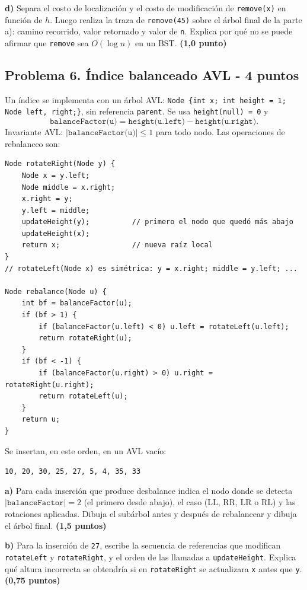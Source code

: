 \documentclass[11pt,a4paper]{article}
\newcommand{\pts}[1]{\textbf{(#1)}}
\begin{document}
\textbf{d)} Separa el costo de localización y el costo de modificación de \texttt{remove(x)} en función de $h$. Luego realiza la traza de \texttt{remove(45)} sobre el árbol final de la parte a): camino recorrido, valor retornado y valor de \texttt{n}. Explica por qué no se puede afirmar que \texttt{remove} sea $O(\log n)$ en un BST. \pts{1,0 punto}

\newpage
\subsection*{Problema 6. Índice balanceado AVL - 4 puntos}

Un índice se implementa con un árbol AVL:
\texttt{Node \{int x; int height = 1; Node left, right;\}}, sin referencia \texttt{parent}. Se usa \texttt{height(null) = 0} y
\[
\texttt{balanceFactor(u)} = \texttt{height(u.left)} - \texttt{height(u.right)}.
\]
Invariante AVL: $|\texttt{balanceFactor(u)}| \le 1$ para todo nodo. Las operaciones de rebalanceo son:

\begin{lstlisting}
Node rotateRight(Node y) {
    Node x = y.left;
    Node middle = x.right;
    x.right = y;
    y.left = middle;
    updateHeight(y);          // primero el nodo que quedó más abajo
    updateHeight(x);
    return x;                 // nueva raíz local
}
// rotateLeft(Node x) es simétrica: y = x.right; middle = y.left; ...

Node rebalance(Node u) {
    int bf = balanceFactor(u);
    if (bf > 1) {
        if (balanceFactor(u.left) < 0) u.left = rotateLeft(u.left);
        return rotateRight(u);
    }
    if (bf < -1) {
        if (balanceFactor(u.right) > 0) u.right = rotateRight(u.right);
        return rotateLeft(u);
    }
    return u;
}
\end{lstlisting}

Se insertan, en este orden, en un AVL vacío:
\begin{center}
\texttt{10, 20, 30, 25, 27, 5, 4, 35, 33}
\end{center}

\textbf{a)} Para cada inserción que produce desbalance indica el nodo donde se detecta $|\texttt{balanceFactor}| = 2$ (el primero desde abajo), el caso (LL, RR, LR o RL) y las rotaciones aplicadas. Dibuja el subárbol antes y después de rebalancear y dibuja el árbol final. \pts{1,5 puntos}

\textbf{b)} Para la inserción de \texttt{27}, escribe la secuencia de referencias que modifican \texttt{rotateLeft} y \texttt{rotateRight}, y el orden de las llamadas a \texttt{updateHeight}. Explica qué altura incorrecta se obtendría si en \texttt{rotateRight} se actualizara \texttt{x} antes que \texttt{y}. \pts{0,75 puntos}
\end{document}
